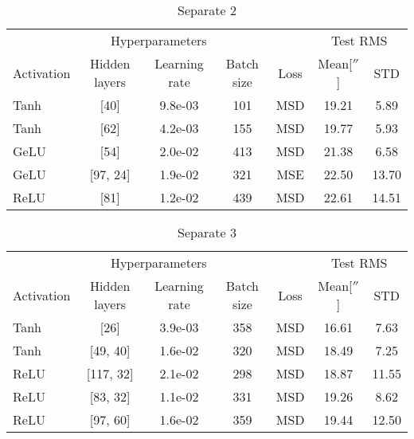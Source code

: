 \begin{table}[h]
    \centering
    \caption{Separate 2}
    \begin{tabular}{lcccccc}
        \toprule
        \multicolumn{5}{c}{Hyperparameters} & \multicolumn{2}{c}{Test RMS} \\   
        \cmidrule(lr){1-5} \cmidrule(lr){6-7}
        Activation & Hidden layers & Learning rate & Batch size & Loss & Mean[$''$] & STD\\
        \midrule
        Tanh &        [40] &       9.8e-03 &        101 & MSD &    19.21 &  5.89 \\
        Tanh &        [62] &       4.2e-03 &        155 & MSD &    19.77 &  5.93 \\
        GeLU &        [54] &       2.0e-02 &        413 & MSD &    21.38 &  6.58 \\
        GeLU &    [97, 24] &       1.9e-02 &        321 & MSE &    22.50 & 13.70 \\
        ReLU &        [81] &       1.2e-02 &        439 & MSD &    22.61 & 14.51 \\
  \bottomrule
    \end{tabular}
\end{table}


\begin{table}[h]
    \centering
    \caption{Separate 3}
    \begin{tabular}{lcccccc}
        \toprule
        \multicolumn{5}{c}{Hyperparameters} & \multicolumn{2}{c}{Test RMS} \\
        \cmidrule(lr){1-5} \cmidrule(lr){6-7}
        Activation & Hidden layers & Learning rate & Batch size & Loss & Mean[$''$] & STD\\
        \midrule
        Tanh &        [26] &       3.9e-03 &        358 & MSD &    16.61 &  7.63 \\
        Tanh &    [49, 40] &       1.6e-02 &        320 & MSD &    18.49 &  7.25 \\
        ReLU &   [117, 32] &       2.1e-02 &        298 & MSD &    18.87 & 11.55 \\
        ReLU &    [83, 32] &       1.1e-02 &        331 & MSD &    19.26 &  8.62 \\
        ReLU &    [97, 60] &       1.6e-02 &        359 & MSD &    19.44 & 12.50 \\
  \bottomrule
    \end{tabular}
\end{table}

